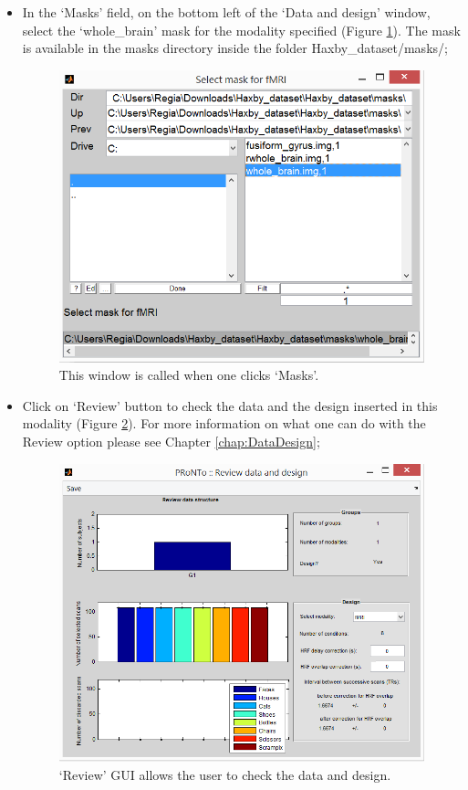 \begin{itemize}
	\item In the `Masks' field, on the bottom left of the `Data and design' window, select the `whole\_brain' mask for the modality specified (Figure \ref{fig:mask}). The mask is available in the masks directory inside the folder Haxby\_dataset/masks/;

\begin{figure}[!h]
	\centering
		\includegraphics[scale=0.65]{images/Tutorial/classification/mask.png}
	\caption{This window is called when one clicks `Masks'.}
	\label{fig:mask}
\end{figure}

	\item Click on `Review' button to check the data and the design inserted in this modality (Figure \ref{fig:review}). For more information on what one can do with the Review option please see Chapter \ref{chap:DataDesign};
	
	
\begin{figure}[!h]
	\centering
		\includegraphics[scale=0.7]{images/Tutorial/classification/review.png}
	\caption{`Review' GUI allows the user to check the data and design.}
	\label{fig:review}
\end{figure}	
	

\end{itemize}
